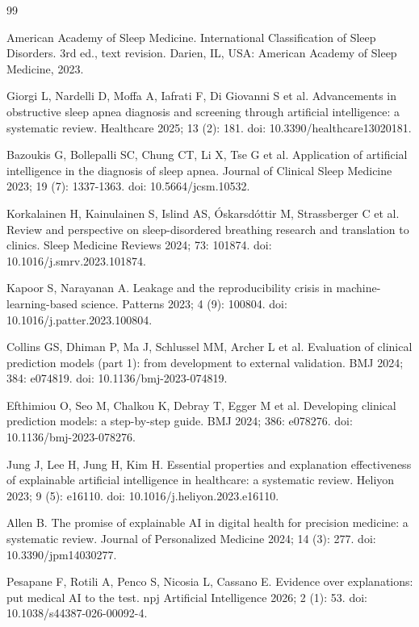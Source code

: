 \documentclass{turkjour}%
\begin{document}
\begin{thebibliography}{99}

American Academy of Sleep Medicine. International Classification of Sleep Disorders. 3rd ed., text revision. Darien, IL, USA: American Academy of Sleep Medicine, 2023.

Giorgi L, Nardelli D, Moffa A, Iafrati F, Di Giovanni S et al. Advancements in obstructive sleep apnea diagnosis and screening through artificial intelligence: a systematic review. Healthcare 2025; 13 (2): 181. doi: 10.3390/healthcare13020181.

Bazoukis G, Bollepalli SC, Chung CT, Li X, Tse G et al. Application of artificial intelligence in the diagnosis of sleep apnea. Journal of Clinical Sleep Medicine 2023; 19 (7): 1337-1363. doi: 10.5664/jcsm.10532.

Korkalainen H, Kainulainen S, Islind AS, \'{O}skarsd\'{o}ttir M, Strassberger C et al. Review and perspective on sleep-disordered breathing research and translation to clinics. Sleep Medicine Reviews 2024; 73: 101874. doi: 10.1016/j.smrv.2023.101874.

Kapoor S, Narayanan A. Leakage and the reproducibility crisis in machine-learning-based science. Patterns 2023; 4 (9): 100804. doi: 10.1016/j.patter.2023.100804.

Collins GS, Dhiman P, Ma J, Schlussel MM, Archer L et al. Evaluation of clinical prediction models (part 1): from development to external validation. BMJ 2024; 384: e074819. doi: 10.1136/bmj-2023-074819.

Efthimiou O, Seo M, Chalkou K, Debray T, Egger M et al. Developing clinical prediction models: a step-by-step guide. BMJ 2024; 386: e078276. doi: 10.1136/bmj-2023-078276.

Jung J, Lee H, Jung H, Kim H. Essential properties and explanation effectiveness of explainable artificial intelligence in healthcare: a systematic review. Heliyon 2023; 9 (5): e16110. doi: 10.1016/j.heliyon.2023.e16110.

Allen B. The promise of explainable AI in digital health for precision medicine: a systematic review. Journal of Personalized Medicine 2024; 14 (3): 277. doi: 10.3390/jpm14030277.

Pesapane F, Rotili A, Penco S, Nicosia L, Cassano E. Evidence over explanations: put medical AI to the test. npj Artificial Intelligence 2026; 2 (1): 53. doi: 10.1038/s44387-026-00092-4.


\end{thebibliography}
\end{document}
